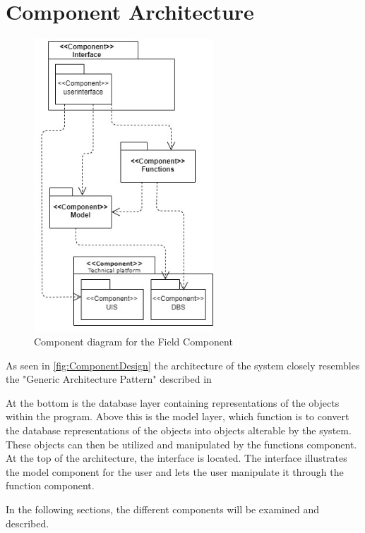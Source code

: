 \section{Component Architecture} \label{sc:component_architecture}
\begin{figure}[H]
    \centering
    \includegraphics[width=0.6\textwidth]{figures/ComponentDiagrams/Componentdiagram.jpg}
    \caption{Component diagram for the Field Component}
    \label{fig:ComponentDesign}
\end{figure}
As seen in \autoref{fig:ComponentDesign} the architecture of the system closely resembles the "Generic Architecture Pattern" described in \citep[p 198]{OOAD}
\par
At the bottom is the database layer containing representations of the objects within the program. Above this is the model layer, which function is to convert the database representations of the objects into objects alterable by the system. These objects can then be utilized and manipulated by the functions component. At the top of the architecture, the interface is located. The interface illustrates the model component for the user and lets the user manipulate it through the function component.
\par
In the following sections, the different components will be examined and described.